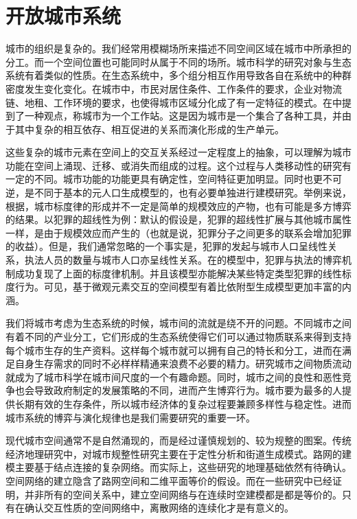 \chapter{开放城市系统}

城市的组织是复杂的。我们经常用模糊场所来描述不同空间区域在城市中所承担的分工。而一个空间位置也可能同时从属于不同的场所。城市科学的研究对象与生态系统有着类似的性质。在生态系统中，多个组分相互作用导致各自在系统中的种群密度发生变化变化。在城市中，市民对居住条件、工作条件的要求，企业对物流链、地租、工作环境的要求，也使得城市区域分化成了有一定特征的模式。在\cite{christopherson1986city}中提到了一种观点，称城市为一个工作站。这是因为城市是一个集合了各种工具，并由于其中复杂的相互依存、相互促进的关系而演化形成的生产单元。

这些复杂的城市元素在空间上的交互关系经过一定程度上的抽象，可以理解为城市功能在空间上涌现、迁移、或消失而组成的过程。这个过程与人类移动性\cite{molas2017field,gonzalez2008understanding,song2010limits,song2010modelling}的研究有一定的不同。城市功能的功能更具有确定性，空间特征更加明显。同时也更不可逆，是不同于基本的元人口生成模型的，也有必要单独进行建模研究。举例来说，根据\cite{banerjee2015competitive}，城市标度律的形成并不一定是简单的规模效应的产物，也有可能是多方博弈的结果。以犯罪的超线性为例：默认的假设是，犯罪的超线性扩展与其他城市属性一样，是由于规模效应而产生的（也就是说，犯罪分子之间更多的联系会增加犯罪的收益）。但是，我们通常忽略的一个事实是，犯罪的发起与城市人口呈线性关系，执法人员的数量与城市人口亦呈线性关系。在\cite{banerjee2015competitive}的模型中，犯罪与执法的博弈机制成功复现了上面的标度律机制。并且该模型亦能解决某些特定类型犯罪的线性标度行为。可见，基于微观元素交互的空间模型有着比依附型生成模型更加丰富的内涵。

我们将城市考虑为生态系统的时候，城市间的流就是绕不开的问题。不同城市之间有着不同的产业分工，它们形成的生态系统使得它们可以通过物质联系来得到支持每个城市生存的生产资料。这样每个城市就可以拥有自己的特长和分工，进而在满足自身生存需求的同时不必样样精通来浪费不必要的精力。研究城市之间物质流动就成为了城市科学在城市间尺度的一个有趣命题。同时，城市之间的良性和恶性竞争也会导致政府制定的发展策略的不同，进而产生博弈行为。城市要为最多的人提供长期有效的生存条件，所以城市经济体的复杂过程要兼顾多样性与稳定性。进而城市系统的博弈与演化规律也是我们需要研究的重要一环。

现代城市空间通常不是自然涌现的，而是经过谨慎规划的、较为规整的图案。传统经济地理研究中，对城市规整性研究主要在于定性分析\cite{colonna2002proposal}和街道生成模式\cite{barthelemy2008modeling}。路网的建模主要基于结点连接的复杂网络。而实际上，这些研究的地理基础依然有待确认。空间网络的建立隐含了路网空间和二维平面等价的假设。而在一些研究中\cite{DURRETT1994363}已经证明，并非所有的空间关系中，建立空间网络与在连续时空建模都是都是等价的。只有在确认交互性质的空间网络中，离散网络的连续化才是有意义的。

